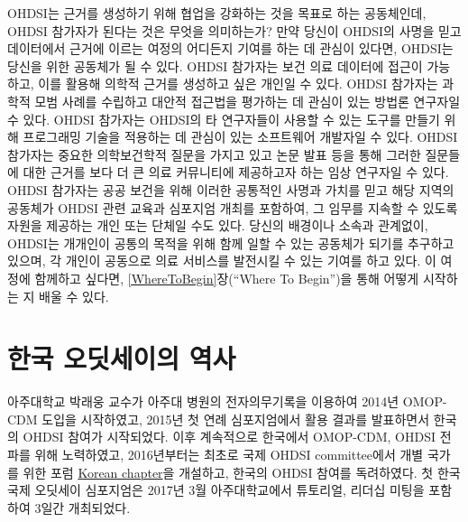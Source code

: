 \documentclass[11pt]{book}
\theoremstyle{definition}
\theoremstyle{definition}
\theoremstyle{definition}
\theoremstyle{remark}
\begin{document}
OHDSI는 근거를 생성하기 위해 협업을 강화하는 것을 목표로 하는
공동체인데, OHDSI 참가자가 된다는 것은 무엇을 의미하는가? 만약 당신이
OHDSI의 사명을 믿고 데이터에서 근거에 이르는 여정의 어디든지 기여를 하는
데 관심이 있다면, OHDSI는 당신을 위한 공동체가 될 수 있다. OHDSI
참가자는 보건 의료 데이터에 접근이 가능하고, 이를 활용해 의학적 근거를
생성하고 싶은 개인일 수 있다. OHDSI 참가자는 과학적 모범 사례를 수립하고
대안적 접근법을 평가하는 데 관심이 있는 방법론 연구자일 수 있다. OHDSI
참가자는 OHDSI의 타 연구자들이 사용할 수 있는 도구를 만들기 위해
프로그래밍 기술을 적용하는 데 관심이 있는 소프트웨어 개발자일 수 있다.
OHDSI 참가자는 중요한 의학보건학적 질문을 가지고 있고 논문 발표 등을
통해 그러한 질문들에 대한 근거를 보다 더 큰 의료 커뮤니티에 제공하고자
하는 임상 연구자일 수 있다. OHDSI 참가자는 공공 보건을 위해 이러한
공통적인 사명과 가치를 믿고 해당 지역의 공동체가 OHDSI 관련 교육과
심포지엄 개최를 포함하여, 그 임무를 지속할 수 있도록 자원을 제공하는
개인 또는 단체일 수도 있다. 당신의 배경이나 소속과 관계없이, OHDSI는
개개인이 공통의 목적을 위해 함께 일할 수 있는 공동체가 되기를 추구하고
있으며, 각 개인이 공동으로 의료 서비스를 발전시킬 수 있는 기여를 하고
있다. 이 여정에 함께하고 싶다면, \ref{WhereToBegin}장(``Where To
Begin'')을 통해 어떻게 시작하는 지 배울 수 있다.

\section{한국 오딧세이의 역사}\label{--}

아주대학교 박래웅 교수가 아주대 병원의 전자의무기록을 이용하여 2014년
OMOP-CDM 도입을 시작하였고, 2015년 첫 연례 심포지엄에서 활용 결과를
발표하면서 한국의 OHDSI 참여가 시작되었다. 이후 계속적으로 한국에서
OMOP-CDM, OHDSI 전파를 위해 노력하였고, 2016년부터는 최초로 국제 OHDSI
committee에서 개별 국가를 위한 포럼
\href{http://forums.ohdsi.org/c/For-collaborators-wishing-to-communicate-in-Korean}{Korean
chapter}을 개설하고, 한국의 OHDSI 참여를 독려하였다. 첫 한국 국제
오딧세이 심포지엄은 2017년 3월 아주대학교에서 튜토리얼, 리더십 미팅을
포함하여 3일간 개최되었다.
\end{document}
